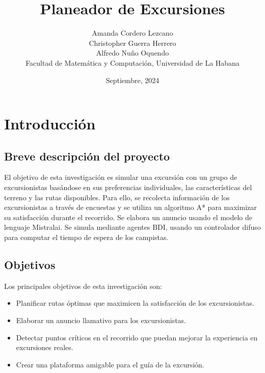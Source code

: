 \documentclass[10pt,twocolumn]{article}
\begin{document}
	\title{Planeador de Excursiones}
	\author{
		Amanda Cordero Lezcano\\
		Christopher Guerra Herrero\\
		Alfredo Nuño Oquendo\\Facultad de Matemática y Computación, Universidad de La Habana
	}
	\date{Septiembre, 2024}
	
	\section{Introducción}
	\subsection{Breve descripción del proyecto}
	El objetivo de esta investigación es simular una excursión con un grupo de excursionistas basándose en sus preferencias individuales, las características del terreno y las rutas disponibles. Para ello, se recolecta información de los excursionistas a través de encuestas y se utiliza un algoritmo A* para maximizar su satisfacción durante el recorrido. Se elabora un anuncio usando el modelo de lenguaje Mistralai. Se simula mediante agentes BDI, usando un controlador difuso para computar el tiempo de espera de los campistas.
	
	\subsection{Objetivos}
	Los principales objetivos de esta investigación son:
	\begin{itemize}
		\item Planificar rutas óptimas que maximicen la satisfacción de los excursionistas.
		\item Elaborar un anuncio llamativo para los excursionistas.
		\item Detectar puntos críticos en el recorrido que puedan mejorar la experiencia en excursiones reales.
		\item Crear una plataforma amigable para el guía de la excursión.
	\end{itemize}
	
\end{document}
